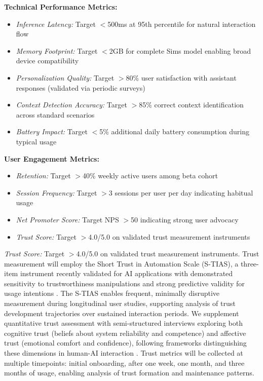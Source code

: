 \documentclass[11pt]{article}
\begin{document}
\textbf{Technical Performance Metrics:}
\begin{itemize}[noitemsep]
    \item \textit{Inference Latency:} Target $<$500ms at 95th percentile for natural interaction flow
    \item \textit{Memory Footprint:} Target $<$2GB for complete Sims model enabling broad device compatibility
    \item \textit{Personalization Quality:} Target $>$80\% user satisfaction with assistant responses (validated via periodic surveys)
    \item \textit{Context Detection Accuracy:} Target $>$85\% correct context identification across standard scenarios
    \item \textit{Battery Impact:} Target $<$5\% additional daily battery consumption during typical usage
\end{itemize}

\textbf{User Engagement Metrics:}
\begin{itemize}[noitemsep]
    \item \textit{Retention:} Target $>$40\% weekly active users among beta cohort
    \item \textit{Session Frequency:} Target $>$3 sessions per user per day indicating habitual usage
    \item \textit{Net Promoter Score:} Target NPS $>$50 indicating strong user advocacy
    \item \textit{Trust Score:} Target $>$4.0/5.0 on validated trust measurement instruments
\end{itemize}

\textit{Trust Score:} Target $>$4.0/5.0 on validated trust measurement 
instruments. Trust measurement will employ the Short Trust in Automation Scale 
(S-TIAS), a three-item instrument recently validated for AI applications with 
demonstrated sensitivity to trustworthiness manipulations and strong predictive 
validity for usage intentions \cite{mcgrath2025tias}. The S-TIAS enables 
frequent, minimally disruptive measurement during longitudinal user studies, 
supporting analysis of trust development trajectories over sustained 
interaction periods. We supplement quantitative trust assessment with 
semi-structured interviews exploring both cognitive trust (beliefs about system 
reliability and competence) and affective trust (emotional comfort and 
confidence), following frameworks distinguishing these dimensions in human-AI 
interaction \cite{yang2024trust}. Trust metrics will be collected at multiple 
timepoints: initial onboarding, after one week, one month, and three months 
of usage, enabling analysis of trust formation and maintenance patterns.
\end{document}
